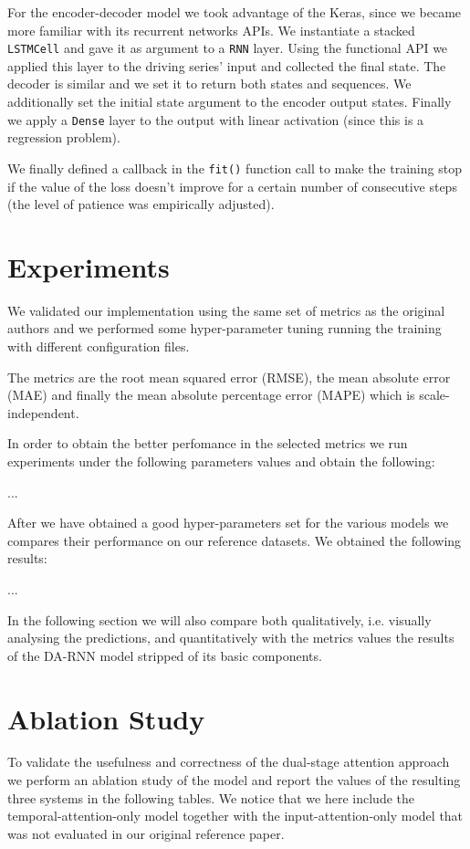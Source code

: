 \documentclass{article}
\begin{document}
For the encoder-decoder model we took advantage of the Keras, since we became more
familiar with its recurrent networks APIs. We instantiate a stacked 
\texttt{LSTMCell} and gave it as argument to a \texttt{RNN} layer. Using the 
functional API we applied this layer to the driving series' input and collected
the final state. The decoder is similar and we set it to return both states and 
sequences. We additionally set the initial state argument to the encoder output 
states. Finally we apply a \texttt{Dense} layer to the output with linear 
activation (since this is a regression problem).

We finally defined a callback in the \texttt{fit()} function call to make the
training stop if the value of the loss doesn't improve for a certain number of 
consecutive steps (the level of patience was empirically adjusted).

\section{Experiments}

We validated our implementation using the same set of metrics as the original 
authors and we performed some hyper-parameter tuning running the training with
different configuration files.

The metrics are the root mean squared error (RMSE), the mean absolute error (MAE) 
and finally the mean absolute percentage error (MAPE) which is scale-independent.

In order to obtain the better perfomance in the selected metrics we run
experiments under the following parameters values and obtain the following:

...

After we have obtained a good hyper-parameters set for the various models we 
compares their performance on our reference datasets. We obtained the following 
results:

...

In the following section we will also compare both qualitatively, i.e. visually 
analysing the predictions, and quantitatively with the metrics values the results 
of the DA-RNN model stripped of its basic components.


\section{Ablation Study}

To validate the usefulness and correctness of the dual-stage attention approach we
perform an ablation study of the model and report the values of the resulting 
three systems in the following tables. We notice that we here include the 
temporal-attention-only model together with the input-attention-only model that
was not evaluated in our original reference paper.
\end{document}
